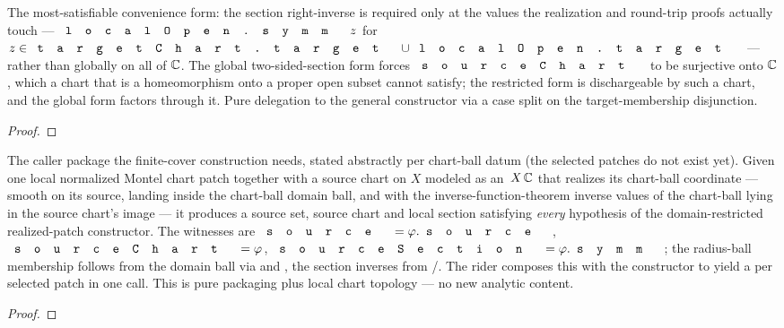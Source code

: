 \begin{lemma}
\label{lem:montel-realized-patch-local-section-form}
The most-satisfiable convenience form: the section right-inverse is required only
at the values the realization and round-trip proofs actually touch —
\(\code{localOpen.symm}\,z\) for \(z\in\code{targetChart.target}\cup
\code{localOpen.target}\) — rather than globally on all of \(\mathbb{C}\). The global
two-sided-section form forces \(\code{sourceChart}\) to be surjective onto \(\mathbb{C}\),
which a chart that is a homeomorphism onto a proper open subset cannot satisfy;
the restricted form is dischargeable by such a chart, and the global form factors
through it. Pure delegation to the general constructor via a case split on the
target-membership disjunction.
\leanok
\end{lemma}
\begin{proof}\leanok\end{proof}

\begin{lemma}
\label{lem:montel-source-chart-package}
The caller package the finite-cover construction needs, stated abstractly per
chart-ball datum (the selected patches do not exist yet). Given one local
normalized Montel chart patch together with a source chart on \(X\) modeled as an
\,\(X\,\mathbb{C}\) that realizes its chart-ball coordinate —
smooth on its source, landing inside the chart-ball domain ball, and with the
inverse-function-theorem inverse values of the chart-ball lying in the source
chart's image — it produces a source set, source chart and local section
satisfying \emph{every} hypothesis of the domain-restricted realized-patch
constructor. The witnesses are \(\code{source}=\varphi.\code{source}\),
\(\code{sourceChart}=\varphi\), \(\code{sourceSection}=\varphi.\code{symm}\); the
radius-ball membership follows from the domain ball via
 and , the section
inverses from /. The rider
 composes this with the
constructor to yield a  per selected patch in one call.
This is pure packaging plus local chart topology — no new analytic content.
\leanok
\end{lemma}
\begin{proof}\leanok\end{proof}

